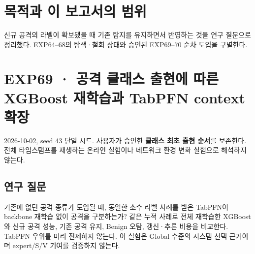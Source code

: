 




\section*{목적과 이 보고서의 범위}

신규 공격의 라벨이 확보됐을 때 기존 탐지를 유지하면서 반영하는 것을 연구 질문으로 정리했다. EXP64–68의 탐색·철회 상태와 승인된 EXP69–70 순차 도입을 구별한다.


\section{EXP69 · 공격 클래스 출현에 따른 XGBoost 재학습과 TabPFN context 확장}
2026-10-02, seed 43 단일 시드. 사용자가 승인한 \textbf{클래스 최초 출현 순서}를 보존한다. 전체 타임스탬프를 재생하는 온라인 실험이나 네트워크 환경 변화 실험으로 해석하지 않는다.

\subsection{연구 질문}
기존에 없던 공격 종류가 도입될 때, 동일한 소수 라벨 사례를 받은 TabPFN이 backbone 재학습 없이 공격을 구분하는가? 같은 누적 사례로 전체 재학습한 XGBoost와 신규 공격 성능, 기존 공격 유지, Benign 오탐, 갱신·추론 비용을 비교한다. TabPFN 우위를 미리 전제하지 않는다. 이 실험은 Global 수준의 시스템 선택 근거이며 expert/\allowbreak{}S/\allowbreak{}V 기여를 검증하지 않는다.


